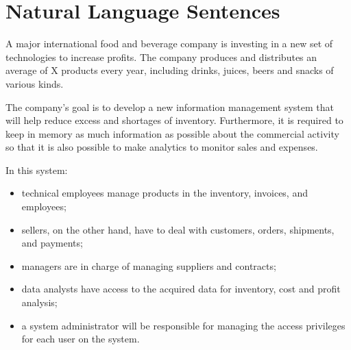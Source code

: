 \section{Natural Language Sentences}

A major international food and beverage company is investing in a new set of technologies to increase profits.
The company produces and distributes an average of X products every year, including drinks, juices, beers and snacks of various kinds.

The company's goal is to develop a new information management system that will help reduce excess and shortages of inventory.
Furthermore, it is required to keep in memory as much information as possible about the commercial activity so that
it is also possible to make analytics to monitor sales and expenses.

In this system:
\begin{itemize}
    \item technical employees manage products in the inventory, invoices, and employees;
    \item sellers, on the other hand, have to deal with customers, orders, shipments, and payments;
    \item managers are in charge of managing suppliers and contracts;
    \item data analysts have access to the acquired data for inventory, cost and profit analysis;
    \item a system administrator will be responsible for managing the access privileges for each user on the system.
\end{itemize}

